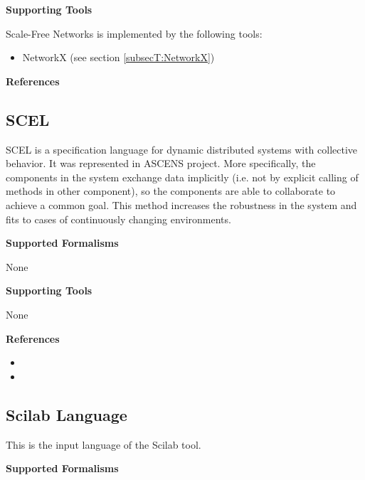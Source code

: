 \textbf{Supporting Tools}

Scale-Free Networks is implemented by the following tools:
\begin{itemize}
	\item NetworkX (see section \ref{subsecT:NetworkX})
\end{itemize}


\textbf{References}




\subsection{SCEL}
\label{subsecL:SCEL}


SCEL is a specification language for dynamic distributed systems with collective behavior. It was represented in ASCENS project. More specifically, the components in the system exchange data implicitly (i.e. not by explicit calling of methods in other component), so the components are able to collaborate to achieve a common goal. This method increases the robustness in the system and fits to cases of continuously changing environments.

\textbf{Supported Formalisms}

None


\textbf{Supporting Tools}

None


\textbf{References}
\begin{itemize}
	
\item {}
	
\item {}
\end{itemize}



\subsection{Scilab Language}
\label{subsecL:ScilabLanguage}


This is the input language of the Scilab tool.

\textbf{Supported Formalisms}

